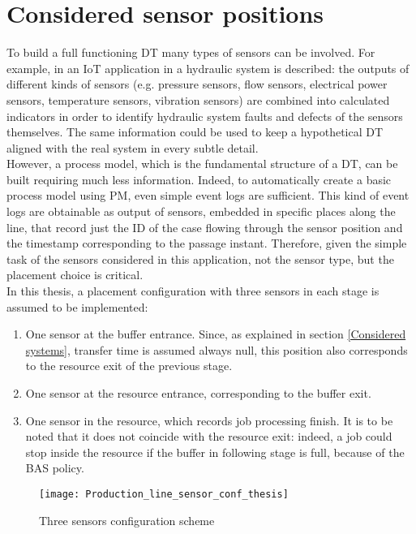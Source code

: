\section{Considered sensor positions}
\label{Considered sensor positions}
To build a full functioning DT many types of sensors can be involved. For example, in \cite{ASchutze2018S4s} an IoT application in a hydraulic system is described: the outputs of different kinds of sensors (e.g. pressure sensors, flow sensors, electrical power sensors, temperature sensors, vibration sensors) are combined into calculated indicators in order to identify hydraulic system faults and defects of the sensors themselves. The same information could be used to keep a hypothetical DT aligned with the real system in every subtle detail. \\
However, a process model, which is the fundamental structure of a DT, can be built requiring much less information. Indeed, to automatically create a basic process model using PM, even simple event logs are sufficient. This kind of event logs are obtainable as output of sensors, embedded in specific places along the line, that record just the ID of the case flowing through the sensor position and the timestamp corresponding to the passage instant. Therefore, given the simple task of the sensors considered in this application, not the sensor type, but the placement choice is critical. \\
In this thesis, a placement configuration with three sensors in each stage is assumed to be implemented:
\begin{enumerate}
	\item One sensor at the buffer entrance. Since, as explained in section \ref{Considered systems}, transfer time is assumed always null, this position also corresponds to the resource exit of the previous stage.
	\item One sensor at the resource entrance, corresponding to the buffer exit.
	\item One sensor in the resource, which records job processing finish. It is to be noted that it does not coincide with the resource exit: indeed, a job could stop inside the resource if the buffer in following stage is full, because of the BAS policy.
\end{enumerate}
\begin{figure}[H] 
\centering    
\texttt{[image: Production\_line\_sensor\_conf\_thesis]}
\caption[Three sensors configuration scheme]{Three sensors configuration scheme}
\label{fig:Three sensors configuration scheme}
\end{figure}
